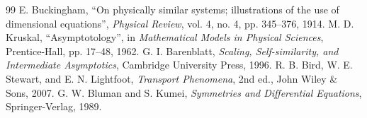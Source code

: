 \documentclass[11pt,a4paper]{article}
\begin{document}
\begin{thebibliography}{99}
 E. Buckingham, ``On physically similar systems; illustrations of the use of dimensional equations'', \emph{Physical Review}, vol. 4, no. 4, pp. 345--376, 1914.
 M. D. Kruskal, ``Asymptotology'', in \emph{Mathematical Models in Physical Sciences}, Prentice-Hall, pp. 17--48, 1962.
 G. I. Barenblatt, \emph{Scaling, Self-similarity, and Intermediate Asymptotics}, Cambridge University Press, 1996.
 R. B. Bird, W. E. Stewart, and E. N. Lightfoot, \emph{Transport Phenomena}, 2nd ed., John Wiley \& Sons, 2007.
 G. W. Bluman and S. Kumei, \emph{Symmetries and Differential Equations}, Springer-Verlag, 1989.
\end{thebibliography}
\end{document}
